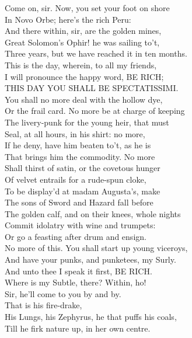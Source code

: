 \documentclass[a4paper,oneside]{memoir}
\begin{document}
\begin{drama*}
\mammonspeaks Come on, sir. Now, you set your foot on shore\\
In Novo Orbe; here's the rich Peru:\\
And there within, sir, are the golden mines,\\
Great Solomon's Ophir! he was sailing to't,\\
Three years, but we have reached it in ten months.\\
This is the day, wherein, to all my friends,\\
I will pronounce the happy word, BE RICH;\\
THIS DAY YOU SHALL BE SPECTATISSIMI.\\
You shall no more deal with the hollow dye,\\
Or the frail card. No more be at charge of keeping\\
The livery-punk for the young heir, that must\\
Seal, at all hours, in his shirt: no more,\\
If he deny, have him beaten to't, as he is\\
That brings him the commodity. No more\\
Shall thirst of satin, or the covetous hunger\\
Of velvet entrails for a rude-spun cloke,\\
To be display'd at madam Augusta's, make\\
The sons of Sword and Hazard fall before\\
The golden calf, and on their knees, whole nights\\
Commit idolatry with wine and trumpets:\\
Or go a feasting after drum and ensign.\\
No more of this. You shall start up young viceroys,\\
And have your punks, and punketees, my Surly.\\
And unto thee I speak it first, BE RICH.\\
Where is my Subtle, there? Within, ho!\\
\facespeaks {} Sir, he'll come to you by and by.\\
\mammonspeaks {} That is his fire-drake,\\
His Lungs, his Zephyrus, he that puffs his coals,\\
Till he firk nature up, in her own centre.\\

\end{drama*}
\end{document}
